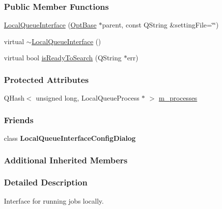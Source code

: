 \subsubsection*{Public Member Functions}
\begin{DoxyCompactItemize}
\item 
\hyperlink{classGlobalSearch_1_1LocalQueueInterface_ae1188c7950216c209249923050410489}{Local\+Queue\+Interface} (\hyperlink{classGlobalSearch_1_1OptBase}{Opt\+Base} $\ast$parent, const Q\+String \&setting\+File=\char`\"{}\char`\"{})
\item 
virtual \hyperlink{classGlobalSearch_1_1LocalQueueInterface_a1749a7451caa140ecd6cc244a5117f99}{$\sim$\+Local\+Queue\+Interface} ()
\item 
virtual bool \hyperlink{classGlobalSearch_1_1LocalQueueInterface_ab414f1b5b47610e45fece054512566ed}{is\+Ready\+To\+Search} (Q\+String $\ast$err)
\end{DoxyCompactItemize}
\subsubsection*{Protected Attributes}
\begin{DoxyCompactItemize}
\item 
Q\+Hash$<$ unsigned long, Local\+Queue\+Process $\ast$ $>$ \hyperlink{classGlobalSearch_1_1LocalQueueInterface_a7a7326a16048896fd7c88d17e3973cda}{m\+\_\+processes}
\end{DoxyCompactItemize}
\subsubsection*{Friends}
\begin{DoxyCompactItemize}
\item 
\hypertarget{classGlobalSearch_1_1LocalQueueInterface_aa3688f9c489918804f3ee222a3a9f028}{}class {\bfseries Local\+Queue\+Interface\+Config\+Dialog}\label{classGlobalSearch_1_1LocalQueueInterface_aa3688f9c489918804f3ee222a3a9f028}

\end{DoxyCompactItemize}
\subsubsection*{Additional Inherited Members}


\subsubsection{Detailed Description}
Interface for running jobs locally. 

